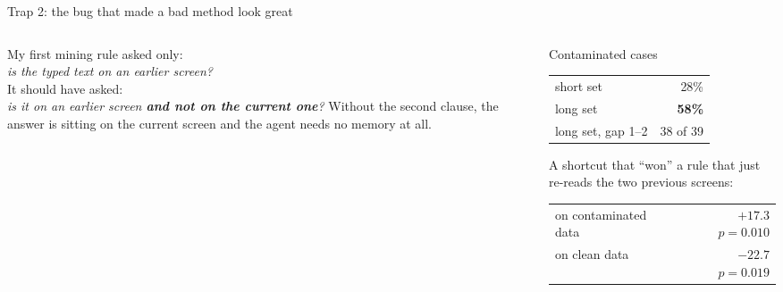 \documentclass[aspectratio=169,10pt]{beamer}
\newcommand{\gr}[1]{{\color{ncgray}#1}}
\begin{document}
\begin{frame}{Trap 2: the bug that made a bad method look great}
\vspace{0.3cm}
\begin{columns}[T]
\begin{column}{0.52\textwidth}
My first mining rule asked only:\\[0.3em]
\gr{\itshape is the typed text on an earlier screen?}\\[0.8em]
It should have asked:\\[0.3em]
{\color{wolfred}\itshape is it on an earlier screen \textbf{and not on the current one}?}
\vspace{0.9em}
Without the second clause, the answer is sitting on the current screen and the agent needs \alert{no memory at all}.
\end{column}
\begin{column}{0.45\textwidth}
\begin{block}{Contaminated cases}
\begin{tabular}{lr}
short set & 28\%\\
long set & \textbf{58\%}\\
\gr{long set, gap 1--2} & \gr{38 of 39}\\
\end{tabular}
\end{block}
\vspace{0.5em}
\begin{block}{A shortcut that ``won''}
a rule that just re-reads the two previous screens:\\[0.3em]
\begin{tabular}{lr}
on contaminated data & \alert{$+17.3$} \gr{$p{=}0.010$}\\
on clean data & \alert{$-22.7$} \gr{$p{=}0.019$}\\
\end{tabular}
\end{block}
\end{column}
\end{columns}
\end{frame}
\end{document}
